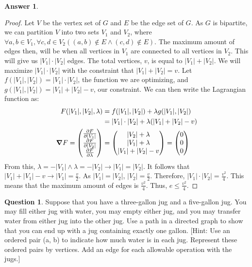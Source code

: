 \documentclass[article, 12pt]{article}
\theoremstyle{definition}
\newtheorem{question}{Question}
\newtheorem{answer}{Answer}
\begin{document}
    \begin{answer}
        \begin{proof}
            Let $V$ be the vertex set of $G$ and $E$ be the edge set of $G$. As $G$ is bipartite, we can partition $V$ into two sets $V_1$ and $V_2$, where $\forall a,b \in V_1, \forall c,d \in V_2 ((a,b) \not\in E \land (c,d) \not\in E)$. The maximum amount of edges then, will be when all vertices in $V_1$ are connected to all vertices in $V_2$. This will give us $|V_1| \cdot |V_2|$ edges. The total vertices, $v$, is equal to $|V_1| + |V_2|$. We will maximize $|V_1| \cdot |V_2|$ with the constraint that $|V_1| + |V_2| = v$. Let $f(|V_1|,|V_2|) = |V_1| \cdot |V_2|$, the function we are optimizing, and $g(|V_1|,|V_2|) = |V_1| + |V_2| - v$, our constraint. We can then write the Lagrangian function as:
            \begin{align*}
                F(|V_1|,|V_2|,\lambda) &= f(|V_1|,|V_2|) + \lambda g(|V_1|,|V_2|) \\
                               &= |V_1| \cdot |V_2| + \lambda(|V_1| + |V_2| - v) \\
                \grad F        = \begin{pmatrix}
                    \frac{\partial F}{\partial |V_1|} \\
                    \frac{\partial F}{\partial |V_2|} \\
                    \frac{\partial F}{\partial \lambda}
                \end{pmatrix} 
                &= \begin{pmatrix}
                    |V_2| + \lambda \\
                    |V_1| + \lambda \\
                    |V_1| + |V_2| - v
                \end{pmatrix} = \begin{pmatrix}
                    0 \\ 
                    0 \\ 
                    0
                \end{pmatrix}
            \end{align*}
            From this, $\lambda = -|V_1| \land \lambda = -|V_2| \to |V_1| = |V_2|$. It follows that $|V_1| + |V_1| - v \to |V_1| = \frac{v}{2}$. As $|V_1| = |V_2|$, $|V_2| = \frac{v}{2}$. Therefore, $|V_1| \cdot |V_2| = \frac{v^2}{4}$. This means that the maximum amount of edges is $\frac{v^2}{4}$. Thus, $e \leq \frac{v^2}{4}$.
        \end{proof}
    \end{answer}
    \begin{question}
        Suppose that you have a three-gallon jug and a five-gallon jug. You may fill either jug with water, you may empty either jug, and you may transfer water from either jug into the other jug. Use a path in a directed graph to show that you can end up with a jug containing exactly one gallon. [Hint: Use an ordered pair (a, b) to indicate how much water is in each jug. Represent these ordered pairs by vertices. Add an edge for each allowable operation with the jugs.]
    \end{question}
\end{document}
